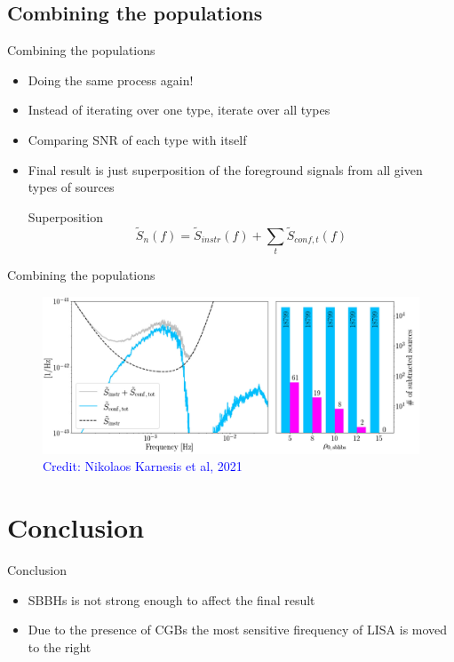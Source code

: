 \documentclass[pdf]{beamer}
\newcommand{\credit}[1]{\tiny{\textcolor{blue}{Credit: #1}}}
\begin{document}
\subsection{Combining the populations}
\begin{frame}{Combining the populations}
\begin{itemize}
\item Doing the same process again!
\item Instead of iterating over one type, iterate over all types
\item Comparing SNR of each type with itself
\item Final result is just superposition of the foreground signals from all given types of sources
\begin{block}{Superposition}
\begin{equation*}
\tilde{S}_n(f) = \tilde{S}_{instr}(f) +\sum_t \tilde{S}_{conf,t}(f)
\end{equation*}
\end{block}
\end{itemize}
\end{frame}

\begin{frame}{Combining the populations}
\begin{figure}
\includegraphics[width=.9\textwidth]{fig/combin.png}
\caption*{\credit{Nikolaos Karnesis et al, 2021}}
\end{figure}
\end{frame}


\section{Conclusion}
\begin{frame}{Conclusion}
\begin{itemize}
\item SBBHs is not strong enough to affect the final result
\item Due to the presence of CGBs the most sensitive firequency of LISA is moved to the right
\end{itemize}
\end{frame}
\end{document}
